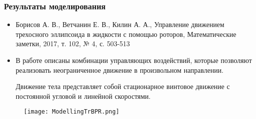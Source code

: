 %	
%	
%	
%	
%	
%	

\begin{frame}
\frametitle{Результаты моделирования}
\begin{itemize}
	\item Борисов А. В., Ветчанин Е. В., Килин А. А., Управление движением трехосного эллипсоида в жидкости с помощью роторов, Математические заметки, 2017, т. 102, № 4, с. 503-513
	\item В работе описаны комбинации управляющих воздействий, которые позволяют реализовать неограниченное движение в произвольном направлении.
	
	Движение тела представляет собой стационарное винтовое движение с постоянной угловой и линейной скоростями. 
\end{itemize}


\begin{figure}[h]
	\centering
	\texttt{[image: ModellingTrBPR.png]}%
\end{figure}



\end{frame}



